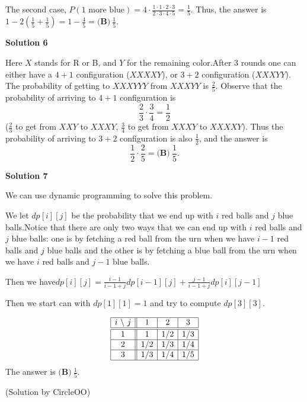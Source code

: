\begin{enumerate}
 The second case, $P(\text{1 more blue}) = 4\cdot\frac{1\cdot1\cdot2\cdot3}{2\cdot3\cdot4\cdot5} = \frac{1}{5}$. Thus, the answer is $1-2\left(\frac{1}{5}+\frac{1}{5}\right)=1-\frac{4}{5}=\boxed{\textbf{(B)}\ \frac{1}{5}}$.

 



\textbf{Solution 6}

Here $X$ stands for R or B, and $Y$ for the remaining color.After 3 rounds one can either have a $4+1$ configuration ($XXXXY$), or $3+2$ configuration ($XXXYY$). The probability of getting to $XXXYYY$ from $XXXYY$ is  $\frac{2}{5}$. Observe that the probability of arriving to $4+1$ configuration is  
 \[\frac{2}{3} \cdot \frac{3}{4} = \frac{1}{2}\] ($\frac{2}{3}$ to get from $XXY$ to $XXXY$, $\frac{3}{4}$ to get from $XXXY$ to $XXXXY$). Thus the probability of arriving to $3+2$ configuration is also $\frac{1}{2}$, and the answer is 
 \[\frac{1}{2} \cdot \frac{2}{5} = \boxed{\textbf{(B)}\ \frac{1}{5}}.\]




\textbf{Solution 7}

We can use dynamic programming to solve this problem.

 We let $dp[i][j]$ be the probability that we end up with $i$ red balls and $j$ blue balls.Notice that there are only two ways that we can end up with $i$ red balls and $j$ blue balls: one is by fetching a red ball from the urn when we have $i - 1$ red balls and $j$ blue balls and the other is by fetching a blue ball from the urn when we have $i$ red balls and $j - 1$ blue balls.

 Then we have$dp[i][j] = \frac{i - 1}{i - 1 + j} dp[i - 1][j] + \frac{j - 1}{i - 1 + j} dp[i][j - 1]$

 Then we start can with $dp[1][1] = 1$ and try to compute $dp[3][3]$.

 
 \[\begin{array}{|c || c | c | c | c | c |} \hline i \text{\ \textbackslash\ } j & 1 & 2 & 3\\ \hline\hline 1 & 1 & 1/2 & 1/3\\ \hline 2 & 1/2 & 1/3 & 1/4\\ \hline 3 & 1/3 & 1/4 & 1/5\\ \hline \end{array}\]The answer is $\boxed{\textbf{(B)}\ \frac{1}{5}}$.

 (Solution by CircleOO)

 




\end{enumerate}
